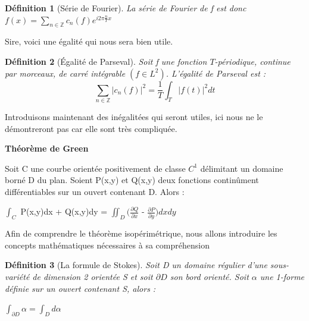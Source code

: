 \documentclass{book}
\newtheorem{definition}{Définition}
\begin{document}
\begin{definition}[Série de Fourier]
La série de Fourier de f est donc
$f(x) = \underset{n \in \mathbb{Z}}{\sum} c_n(f) e^{i2 \pi \frac{n}{T}x}$
\end{definition}

Sire, voici une égalité qui nous sera bien utile.

\begin{definition}[Égalité de Parseval]
Soit f une fonction $T$-périodique, continue par morceaux, de carré intégrable $(f \in L^2)$. L'égalité de Parseval est :
$$ \underset{n \in \mathbb{Z}}{\sum} | c_n (f) | ^2 = \frac{1}{T} \int _T |f(t)|^2 dt$$
\end{definition}

{\noindent Introduisons maintenant des inégalitées qui seront utiles, ici nous ne le démontreront pas car elle sont très compliquée.}

\begin{tcolorbox}[colback=green!6]
\textbf{Théorème de Green}
\begin{center}
Soit C une courbe orientée positivement de classe $C^1$ délimitant un domaine borné D du plan. Soient P(x,y) et Q(x,y) deux fonctions continûment différentiables sur un ouvert contenant D. Alors :\\
\centerline{$\int_C$ P(x,y)dx + Q(x,y)dy = $\iint_D (\frac{\partial Q}{\partial x}$ - $\frac{\partial P}{\partial y})dxdy$}
\end{center}
\end{tcolorbox}

{\noindent Afin de comprendre le théorème isopérimétrique, nous allons introduire les concepts mathématiques nécessaires à sa compréhension}

\begin{definition}[La formule de Stokes]
Soit D un domaine régulier d'une sous-variété de dimension 2 orientée S et soit $\partial D$ son bord orienté. Soit $\alpha$ une 1-forme définie sur un ouvert contenant S, alors :
\centerline{$\int_{\partial D} \alpha = \int_D d\alpha$}
\end{definition}
\end{document}
